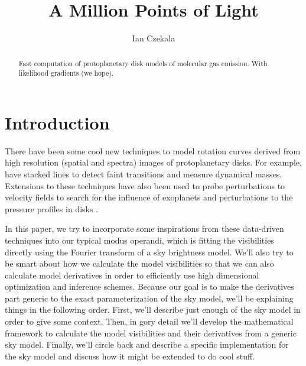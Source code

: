 \documentclass[modern]{aastex62}
\begin{document}
\title{A Million Points of Light}


\author[0000-0002-1483-8811]{Ian Czekala}


\begin{abstract}
Fast computation of protoplanetary disk models of molecular gas emission. With likelihood gradients (we hope).
\end{abstract}


\section{Introduction} \label{sec:intro}

There have been some cool new techniques to model rotation curves derived from high resolution (spatial and spectra) images of protoplanetary disks. For example, \citet{yen16,yen18} have stacked lines to detect faint transitions and measure dynamical masses. Extensions to these techniques have also been used to probe perturbations to velocity fields to search for the influence of exoplanets \citep{teague18a} and perturbations to the pressure profiles in disks \citep{teague18c}.

In this paper, we try to incorporate some inspirations from these data-driven techniques into our typical modus operandi, which is fitting the visibilities directly using the Fourier transform of a sky brightness model. We'll also try to be smart about how we calculate the model visibilities so that we can also calculate model derivatives in order to efficiently use high dimensional optimization and inference schemes. Because our goal is to make the derivatives part generic to the exact parameterization of the sky model, we'll be explaining things in the following order. First, we'll describe just enough of the sky model in order to give some context. Then, in gory detail we'll develop the mathematical framework to calculate the model visibilities and their derivatives from a generic sky model. Finally, we'll circle back and describe a specific implementation for the sky model and discuss how it might be extended to do cool stuff.
\end{document}
